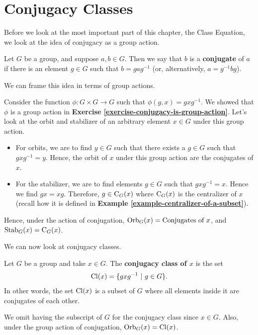 \section{Conjugacy Classes}
Before we look at the most important part of this chapter, the Class Equation, we look at the idea of conjugacy as a group action.
\begin{definition}
    Let $G$ be a group, and suppose $a, b \in G$. Then we say that $b$ is a \textbf{conjugate} of $a$ if there is an element $g \in G$ such that $b = gag^{-1}$ (or, alternatively, $a=g^{-1}bg$).
\end{definition}
We can frame this idea in terms of group actions.

Consider the function $\phi: G\times G\to G$ such that $\phi(g, x) = gxg^{-1}$. We showed that $\phi$ is a group action in \textbf{Exercise \ref{exercise-conjugacy-is-group-action}}. Let's look at the orbit and stabilizer of an arbitrary element $x \in G$ under this group action.
\begin{itemize}
    \item For orbits, we are to find $y \in G$ such that there exists a $g \in G$ such that $gxg^{-1} = y$. Hence, the orbit of $x$ under this group action are the conjugates of $x$.
    \item For the stabilizer, we are to find elements $g \in G$ such that $gxg^{-1} = x$. Hence we find $gx = xg$. Therefore, $g \in \mathrm{C}_{G}(x)$ where $\mathrm{C}_{G}(x)$ is the centralizer of $x$ (recall how it is defined in \textbf{Example \ref{example-centralizer-of-a-subset}}).
\end{itemize}

Hence, under the action of conjugation, $\mathrm{Orb}_{G}(x) = \text{Conjugates of }x$, and $\mathrm{Stab}_{G}(x) = \mathrm{C}_{G}(x)$.

We can now look at conjugacy classes.
\begin{definition}
    Let $G$ be a group and take $x \in G$. The \textbf{conjugacy class of $x$} is the set
    \[
        \mathrm{Cl}(x) = \{gxg^{-1} \ | \ g \in G\}.
    \]
    In other words, the set $\mathrm{Cl}(x)$ is a subset of $G$ where all elements inside it are conjugates of each other.
\end{definition}
\begin{remark}
    We omit having the subscript of $G$ for the conjugacy class since $x \in G$. Also, under the group action of conjugation, $\mathrm{Orb}_{G}(x) = \mathrm{Cl}(x)$.
\end{remark}

